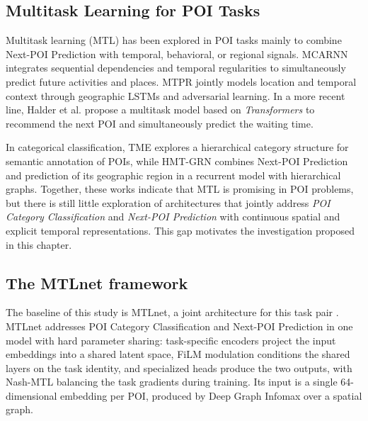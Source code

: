 \subsection{Multitask Learning for POI Tasks}

Multitask learning (MTL) \cite{caruana1997multitask} has been explored in POI tasks mainly to combine Next-POI Prediction with temporal, behavioral, or regional signals. MCARNN \cite{Liao2018} integrates sequential dependencies and temporal regularities to simultaneously predict future activities and places. MTPR \cite{Xia2020} jointly models location and temporal context through geographic LSTMs and adversarial learning. In a more recent line, Halder et al. \cite{Halder2022} propose a multitask model based on \textit{Transformers} to recommend the next POI and simultaneously predict the waiting time.

In categorical classification, TME \cite{Xu2023} explores a hierarchical category structure for semantic annotation of POIs, while HMT-GRN \cite{Lim2022} combines Next-POI Prediction and prediction of its geographic region in a recurrent model with hierarchical graphs. Together, these works indicate that MTL is promising in POI problems, but there is still little exploration of architectures that jointly address \textit{POI Category Classification} and \textit{Next-POI Prediction} with continuous spatial and explicit temporal representations. This gap motivates the investigation proposed in this chapter.

\subsection{The MTLnet framework}
\label{sec:courb:mtlnet-recap}

The baseline of this study is MTLnet, a joint architecture for this task pair \cite{silva2025mtlnet}. MTLnet addresses POI Category Classification and Next-POI Prediction in one model with hard parameter sharing: task-specific encoders project the input embeddings into a shared latent space, FiLM modulation conditions the shared layers on the task identity, and specialized heads produce the two outputs, with Nash-MTL balancing the task gradients during training. Its input is a single 64-dimensional embedding per POI, produced by Deep Graph Infomax over a spatial graph.

